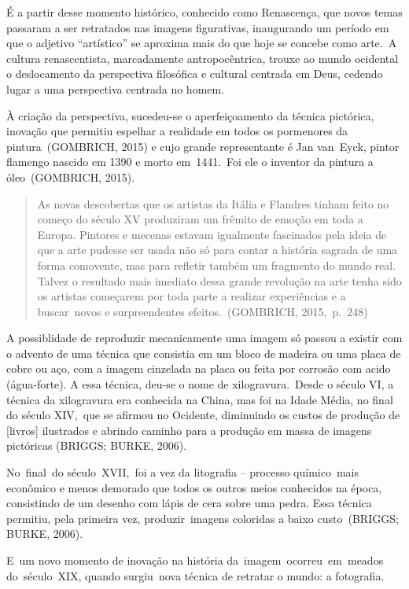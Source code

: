 \documentclass[
  letterpaper,
]{abntex2}
\begin{document}
É a partir desse momento histórico, conhecido como Renascença, que novos
temas passaram a ser retratados nas imagens figurativas, inaugurando um
período em que o adjetivo ``artístico'' se aproxima mais do que hoje se
concebe como arte.~A cultura renascentista, marcadamente
antropocêntrica, trouxe ao mundo ocidental o deslocamento da perspectiva
filosófica e cultural centrada em Deus, cedendo lugar a uma perspectiva
centrada no homem.~

À criação da perspectiva, sucedeu-se o aperfeiçoamento da técnica
pictórica, inovação que permitiu espelhar a realidade em todos os
pormenores da pintura~(GOMBRICH, 2015) e cujo grande representante é Jan
van~Eyck, pintor flamengo nascido em 1390 e morto em~1441.~Foi ele o
inventor da pintura a óleo~(GOMBRICH, 2015).~ ~

\begin{quote}
As novas descobertas que os artistas da Itália e Flandres tinham feito
no começo do século XV produziram um frêmito de emoção em toda a Europa.
Pintores e mecenas estavam igualmente fascinados pela ideia de que a
arte pudesse ser usada não só para contar a história sagrada de uma
forma comovente, mas para refletir também um fragmento do mundo real.
Talvez o resultado mais imediato dessa grande revolução na arte tenha
sido os artistas começarem por toda parte a realizar experiências e a
buscar~novos e surpreendentes efeitos.~(GOMBRICH, 2015,~p.~248)~ ~
\end{quote}

A possiblidade de reproduzir mecanicamente uma imagem só passou a
existir com o advento de uma técnica que consistia em um bloco de
madeira ou uma placa de cobre ou aço, com a imagem cinzelada na placa ou
feita por corrosão com acido (água-forte). A essa técnica, deu-se o nome
de xilogravura.~Desde o século VI, a técnica da xilogravura era
conhecida na China, mas foi na Idade Média, no final do século XIV,~que
se afirmou no Ocidente, diminuindo os custos de produção de {[}livros{]}
ilustrados e abrindo caminho para a produção em massa de imagens
pictóricas (BRIGGS; BURKE, 2006).

No~final~do século~XVII,~foi a vez da litografia -- processo
químico~mais econômico e menos demorado que todos os outros meios
conhecidos na época, consistindo de um desenho com lápis de cera sobre
uma pedra. Essa técnica permitiu, pela primeira vez, produzir~imagens
coloridas a baixo custo~(BRIGGS; BURKE, 2006).~

E~um novo momento de inovação na história da~imagem~ocorreu~em~meados
do~século~XIX, quando surgiu~nova técnica de retratar o mundo: a
fotografia.~
\end{document}
